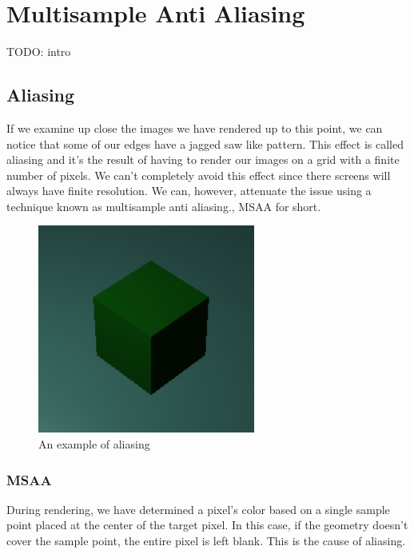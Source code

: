 \chapter{Multisample Anti Aliasing}

TODO: intro

\section{Aliasing}

If we examine up close the images we have rendered up to this point, we
can notice that some of our edges have a jagged saw like pattern.
This effect is called aliasing and it's the result of having to render our
images on a grid with a finite number of pixels.
We can't completely avoid this effect since there screens will always have
finite resolution.
We can, however, attenuate the issue using a technique known as multisample
anti aliasing., MSAA for short.

\begin{figure}[H]
    \centering
    \includegraphics[scale=1.0]{images/ChMSAA/AnExampleOfAliasing.png}
    \caption{An example of aliasing}
    \label{fig::AliasingExample}
\end{figure}

\subsection{MSAA}

During rendering, we have determined a pixel's color based on a single sample
point placed at the center of the target pixel.
In this case, if the geometry doesn't cover the sample point, the entire pixel
is left blank.
This is the cause of aliasing.

